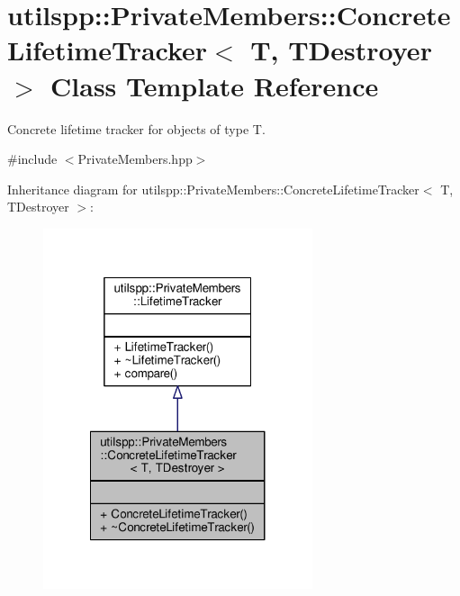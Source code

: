\hypertarget{classutilspp_1_1PrivateMembers_1_1ConcreteLifetimeTracker}{\section{utilspp\-:\-:Private\-Members\-:\-:Concrete\-Lifetime\-Tracker$<$ T, T\-Destroyer $>$ Class Template Reference}
\label{classutilspp_1_1PrivateMembers_1_1ConcreteLifetimeTracker}
}


Concrete lifetime tracker for objects of type T.  




{\ttfamily \#include $<$Private\-Members.\-hpp$>$}



Inheritance diagram for utilspp\-:\-:Private\-Members\-:\-:Concrete\-Lifetime\-Tracker$<$ T, T\-Destroyer $>$\-:
\nopagebreak
\begin{figure}[H]
\begin{center}
\leavevmode
\includegraphics[width=224pt]{classutilspp_1_1PrivateMembers_1_1ConcreteLifetimeTracker__inherit__graph}
\end{center}
\end{figure}


